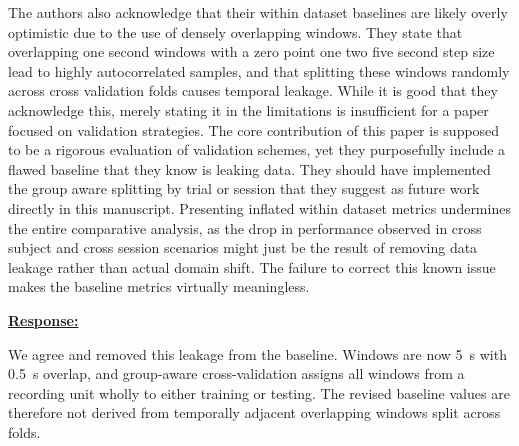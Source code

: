 \documentclass{article}
\begin{document}
\begin{cmt}{}{}

The authors also acknowledge that their within dataset baselines are likely
overly optimistic due to the use of densely overlapping windows. They state that
overlapping one second windows with a zero point one two five second step size
lead to highly autocorrelated samples, and that splitting these windows randomly
across cross validation folds causes temporal leakage. While it is good that
they acknowledge this, merely stating it in the limitations is insufficient for
a paper focused on validation strategies. The core contribution of this paper is
supposed to be a rigorous evaluation of validation schemes, yet they purposefully
include a flawed baseline that they know is leaking data. They should have
implemented the group aware splitting by trial or session that they suggest as
future work directly in this manuscript. Presenting inflated within dataset
metrics undermines the entire comparative analysis, as the drop in performance
observed in cross subject and cross session scenarios might just be the result
of removing data leakage rather than actual domain shift. The failure to correct
this known issue makes the baseline metrics virtually meaningless.

\end{cmt}
\vspace{0.1cm}
\noindent
\underline{\textbf{Response:}}
\vspace{0.2cm}

We agree and removed this leakage from the baseline. Windows are now 5~s with
0.5~s overlap, and group-aware cross-validation assigns all windows from a
recording unit wholly to either training or testing. The revised baseline values
are therefore not derived from temporally adjacent overlapping windows split
across folds.

\vspace{0.3cm}
\end{document}
